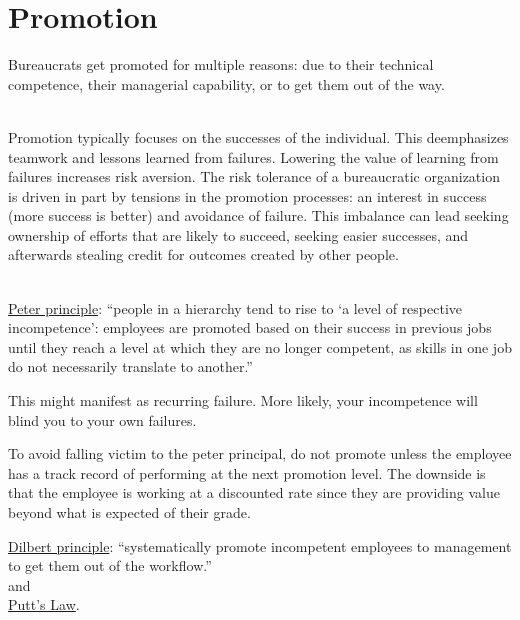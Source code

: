 \section{Promotion\label{sec:promotion}}

Bureaucrats get promoted for multiple reasons: due to their technical competence, their managerial capability, or to get them out of the way.

\ \\

Promotion typically focuses on the successes of the individual. This deemphasizes teamwork and lessons learned from failures. Lowering the value of learning from failures increases risk aversion. The risk tolerance of a bureaucratic organization is driven in part by tensions in the promotion processes: an interest in success (more success is better) and avoidance of failure. This imbalance can lead seeking ownership of efforts that are likely to succeed, seeking easier successes, and afterwards stealing credit for outcomes created by other people. 

\ \\

\href{https://en.wikipedia.org/wiki/Peter_principle}{Peter principle}: 
``people in a hierarchy tend to rise to `a level of respective incompetence': employees are promoted based on their success in previous jobs until they reach a level at which they are no longer competent, as skills in one job do not necessarily translate to another.''

This might manifest as recurring failure. More likely, your incompetence will blind you to your own failures.

To avoid falling victim to the peter principal, do not promote unless the employee has a track record of performing at the next promotion level. The downside is that the employee is working at a discounted rate since they are providing value beyond what is expected of their grade.


\href{https://en.wikipedia.org/wiki/Dilbert_principle}{Dilbert principle}:
``systematically promote incompetent employees to management to get them out of the workflow.''\\
and\\
\href{https://en.wikipedia.org/wiki/Putt\%27s_Law_and_the_Successful_Technocrat}{Putt's Law}.






